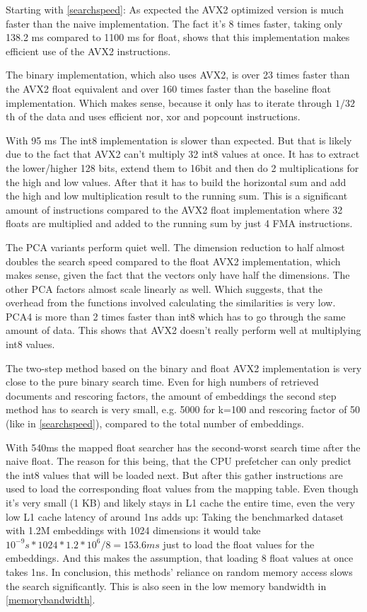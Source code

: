 Starting with \autoref{searchspeed}: As expected the AVX2 optimized version is much faster than the naive implementation. The fact it's 8 times faster, taking only 138.2 ms compared to 1100 ms for float, shows that this implementation makes efficient use of the AVX2 instructions.

The binary implementation, which also uses AVX2, is over 23 times faster than the AVX2 float equivalent and over 160 times faster than the baseline float implementation. Which makes sense, because it only has to iterate through $1/32$th of the data and uses efficient nor, xor and popcount instructions.

With 95 ms The int8 implementation is slower than expected. But that is likely due to the fact that AVX2 can't multiply 32 int8 values at once. It has to extract the lower/higher 128 bits, extend them to 16bit and then do 2 multiplications for the high and low values. After that it has to build the horizontal sum and add the high and low multiplication result to the running sum. This is a significant amount of instructions compared to the AVX2 float implementation where 32 floats are multiplied and added to the running sum by just 4 FMA instructions.

The PCA variants perform quiet well. The dimension reduction to half almost doubles the search speed compared to the float AVX2 implementation, which makes sense, given the fact that the vectors only have half the dimensions. The other PCA factors almost scale linearly as well. Which suggests, that the overhead from the functions involved calculating the similarities is very low. PCA4 is more than 2 times faster than int8 which has to go through the same amount of data. This shows that AVX2 doesn't really perform well at multiplying int8 values.

The two-step method based on the binary and float AVX2 implementation is very close to the pure binary search time. Even for high numbers of retrieved documents and rescoring factors, the amount of embeddings the second step method has to search is very small, e.g. 5000 for k=100 and rescoring factor of 50 (like in \autoref{searchspeed}), compared to the total number of embeddings.

With 540ms the mapped float searcher has the second-worst search time after the naive float. The reason for this being, that the CPU prefetcher can only predict the int8 values that will be loaded next. But after this gather instructions are used to load the corresponding float values from the mapping table. Even though it's very small (1 KB) and likely stays in L1 cache the entire time, even the very low L1 cache latency of around 1ns adds up: Taking the benchmarked dataset with 1.2M embeddings with 1024 dimensions it would take $10^{-9} s * 1024 * 1.2 * 10^{6} / 8 = 153.6 ms$ just to load the float values for the embeddings. And this makes the assumption, that loading 8 float values at once takes 1ns. In conclusion, this methods' reliance on random memory access slows the search significantly. This is also seen in the low memory bandwidth in \autoref{memorybandwidth}.

